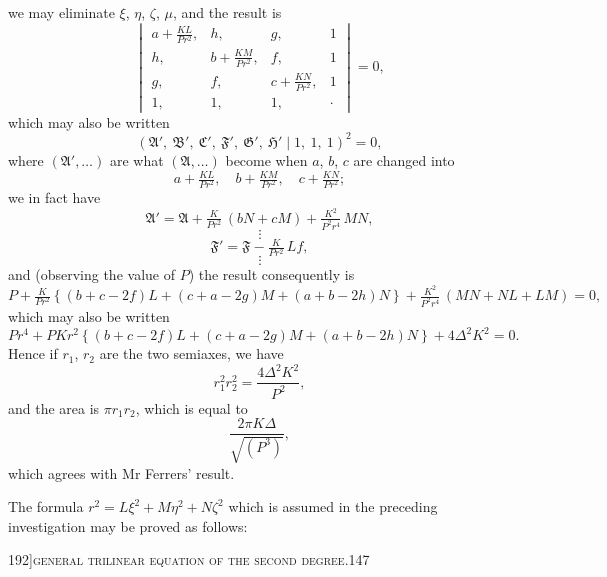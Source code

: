 \documentclass[11pt]{article}
\begin{document}
\medskip

\noindent we may eliminate $\xi$, $\eta$, $\zeta$, $\mu$, and the result is
\[
\begin{vmatrix}
a + \tfrac{K L}{P r^{2}}, & h, & g, & 1 \\
h, & b + \tfrac{K M}{P r^{2}}, & f, & 1 \\
g, & f, & c + \tfrac{K N}{P r^{2}}, & 1 \\
1, & 1, & 1, & \cdot
\end{vmatrix} = 0,
\]
which may also be written
\[
(\mathfrak{A}',\ \mathfrak{B}',\ \mathfrak{C}',\ \mathfrak{F}',\ \mathfrak{G}',\ \mathfrak{H}' \mid 1,\ 1,\ 1)^{2} = 0,
\]
where $(\mathfrak{A}',\ldots)$ are what $(\mathfrak{A},\ldots)$ become when $a$, $b$, $c$ are changed into
\[
a + \tfrac{KL}{P r^{2}}, \quad b + \tfrac{KM}{P r^{2}}, \quad c + \tfrac{KN}{P r^{2}};
\]
we in fact have
\[
\mathfrak{A}' = \mathfrak{A} + \tfrac{K}{P r^{2}}\,(bN + cM) + \tfrac{K^{2}}{P^{2} r^{4}}\,MN,
\]
\[
\vdots
\]
\[
\mathfrak{F}' = \mathfrak{F} - \tfrac{K}{P r^{2}}\,L f,
\]
\[
\vdots
\]
and (observing the value of $P$) the result consequently is
\[
P + \tfrac{K}{P r^{2}}\left\{(b + c - 2 f)L + (c + a - 2 g)M + (a + b - 2 h)N\right\} + \tfrac{K^{2}}{P^{2} r^{4}}\,(MN + NL + LM) = 0,
\]
which may also be written
\[
P r^{4} + P K r^{2}\left\{(b + c - 2 f)L + (c + a - 2 g)M + (a + b - 2 h)N\right\} + 4\Delta^{2} K^{2} = 0.
\]
Hence if $r_{1}$, $r_{2}$ are the two semiaxes, we have
\[
r_{1}^{2} r_{2}^{2} = \frac{4\Delta^{2} K^{2}}{P^{2}},
\]
and the area is $\pi r_{1} r_{2}$, which is equal to
\[
\frac{2\pi K\Delta}{\sqrt{(P^{3})}},
\]
which agrees with Mr Ferrers' result.

The formula $r^{2} = L\xi^{2} + M\eta^{2} + N\zeta^{2}$ which is assumed in the preceding investigation may be proved as follows:

\newpage

\begin{center}
\small 192]\hfill\textsc{general trilinear equation of the second degree.}\hfill\textsc{147}
\end{center}

\medskip
\end{document}
